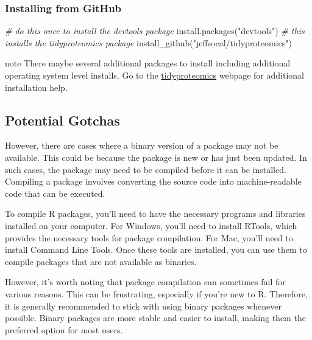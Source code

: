 \documentclass[
]{book}
\newenvironment{Shaded}{\begin{snugshade}}{\end{snugshade}}
\newcommand{\CommentTok}[1]{\textcolor[rgb]{0.56,0.35,0.01}{\textit{#1}}}
\newcommand{\FunctionTok}[1]{\textcolor[rgb]{0.00,0.00,0.00}{#1}}
\newcommand{\NormalTok}[1]{#1}
\newcommand{\StringTok}[1]{\textcolor[rgb]{0.31,0.60,0.02}{#1}}
\begin{document}
\hypertarget{installing-from-github}{%
\subsubsection*{Installing from GitHub}\label{installing-from-github}}

\begin{Shaded}
\begin{Highlighting}[]
\CommentTok{\# do this once to install the devtools package }
\FunctionTok{install.packages}\NormalTok{(}\StringTok{"devtools"}\NormalTok{)}
\CommentTok{\# this installs the tidyproteomics package}
\FunctionTok{install\_github}\NormalTok{(}\StringTok{"jeffsocal/tidyproteomics"}\NormalTok{)}
\end{Highlighting}
\end{Shaded}

\begin{infobox}{note}
There maybe several additional packages to install including additional operating system level installs. Go to the \href{https://jeffsocal.github.io/tidyproteomics/}{tidyproteomics} webpage for additional installation help.

\end{infobox}

\hypertarget{potential-gotchas}{%
\subsection{Potential Gotchas}\label{potential-gotchas}}

However, there are cases where a binary version of a package may not be available. This could be because the package is new or has just been updated. In such cases, the package may need to be compiled before it can be installed. Compiling a package involves converting the source code into machine-readable code that can be executed.

To compile R packages, you'll need to have the necessary programs and libraries installed on your computer. For Windows, you'll need to install RTools, which provides the necessary tools for package compilation. For Mac, you'll need to install Command Line Tools. Once these tools are installed, you can use them to compile packages that are not available as binaries.

However, it's worth noting that package compilation can sometimes fail for various reasons. This can be frustrating, especially if you're new to R. Therefore, it is generally recommended to stick with using binary packages whenever possible. Binary packages are more stable and easier to install, making them the preferred option for most users.
\end{document}
